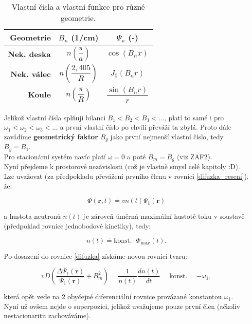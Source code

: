 \begin{table}[h]
\centering
\caption{Vlastní čísla a vlastní funkce pro různé geometrie.}
\label{table_vlastni_funkce}
\begin{tabular}{@{}rcc@{}}
\toprule
\textbf{Geometrie}   & $B_n$ (1/cm)         & $\Psi_n$ (-)                               \\ \midrule
\textbf{Nek. deska}  & $n \left ( \dfrac{\pi}{a} \right )$   & $\cos(B_nx)$              \\ [15pt]
\textbf{Nek. válec}  & $n \left ( \dfrac{2,405}{R} \right )$ & $J_0(B_nr)$               \\ [15pt]
\textbf{Koule}       & $n \left ( \dfrac{\pi}{R} \right )$   & $\dfrac{\sin(B_nr)}{r}$   \\ \bottomrule
\end{tabular}
\end{table}

Jelikož vlastní čísla splňují bilanci $B_1 < B_2 < B_3 < ...$, platí to samé i pro $\omega_1 < \omega_2 < \omega_3 < ...$ a první vlastní číslo po chvíli převáží ta zbylá. Proto dále zavádíme \textbf{geometrický faktor} $B_g$ jako první nejmenší vlastní číslo, tedy $B_g = B_1$.\\

Pro stacionární systém navíc platí $\omega = 0$ a poté $B_m = B_g$ (viz ZAF2).\\

Nyní přejdeme k prostorové nezávislosti (což je vlastně smysl celé kapitoly :D). Lze uvažovat (za předpokladu převážení prvního členu v rovnici \eqref{difuzka_reseni}), že:

$$ \Phi (\textbf{r}, t) \doteq v n(t) \Psi_1 (\textbf{r}) $$

a hustota neutronů $n(t)$ je zároveň úměrná maximální hustotě toku v soustavě (předpoklad rovnice jednobodové kinetiky), tedy:

$$ n(t) \doteq \text{konst.} \cdot \Phi_{max} (t). $$

Po dosazení do rovnice \eqref{difuzka} získáme novou rovnici tvaru:

\begin{equation}
  v D \left ( \dfrac{\Delta \Psi_1 (\textbf{r})}{\Psi_1 (\textbf{r})} + B_m^2 \right ) = \dfrac{1}{n(t)} \dfrac{d n(t)}{d t} = \text{konst.} = - \omega_1,
  \label{rovnice_kinetiky_v_separaci}
\end{equation}

která opět vede na 2 obyčejné diferenciální rovnice provázané konstantou $\omega_1$. Nyní už ovšem nejde o superpozici, jelikož uvažujeme pouze první člen (ačkoliv nestacionaritu zachováváme).\\

